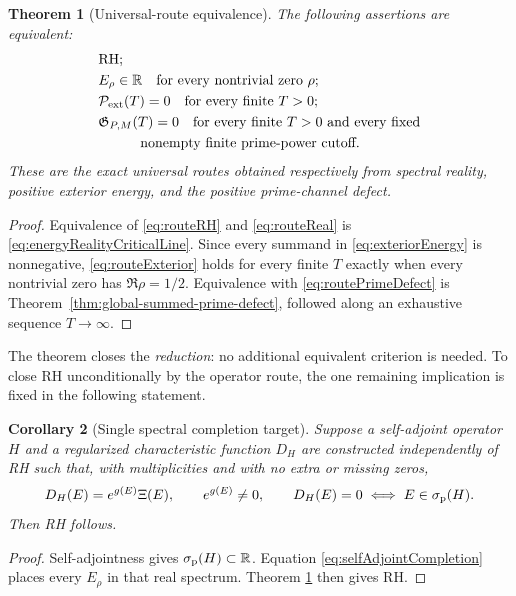 \documentclass[11pt]{amsart}
\newtheorem{theorem}{Theorem}[section]
\newtheorem{corollary}[theorem]{Corollary}
\theoremstyle{definition}
\theoremstyle{remark}
\begin{document}
\begin{theorem}[Universal-route equivalence]\label{thm:universal-route-equivalence}
The following assertions are equivalent:
\begin{align}
 &\text{RH};\label{eq:routeRH}\\
 &E_\rho\in\mathbb R\quad\text{for every nontrivial zero }\rho;\label{eq:routeReal}\\
 &\mathcal P_{\rm ext}(T)=0\quad\text{for every finite }T>0;\label{eq:routeExterior}\\
 &\mathfrak G_{P,M}(T)=0\quad\text{for every finite }T>0
 \text{ and every fixed}\notag\\
 &\hspace{3em}\text{nonempty finite prime-power cutoff}.\label{eq:routePrimeDefect}
\end{align}
These are the exact universal routes obtained respectively from spectral reality, positive
exterior energy, and the positive prime-channel defect.
\end{theorem}

\begin{proof}
Equivalence of \eqref{eq:routeRH} and \eqref{eq:routeReal} is
\eqref{eq:energyRealityCriticalLine}.  Since every summand in
\eqref{eq:exteriorEnergy} is nonnegative, \eqref{eq:routeExterior} holds for every finite
$T$ exactly when every nontrivial zero has $\Re\rho=1/2$.  Equivalence with
\eqref{eq:routePrimeDefect} is Theorem~\ref{thm:global-summed-prime-defect}, followed along
an exhaustive sequence $T\to\infty$.
\end{proof}

The theorem closes the \emph{reduction}: no additional equivalent criterion is needed.  To
close RH unconditionally by the operator route, the one remaining implication is fixed in the
following statement.

\begin{corollary}[Single spectral completion target]\label{cor:spectral-completion-target}
Suppose a self-adjoint operator $H$ and a regularized characteristic function $D_H$ are
constructed independently of RH such that, with multiplicities and with no extra or missing
zeros,
\begin{equation}\label{eq:selfAdjointCompletion}
 D_H(E)=e^{g(E)}\Xi(E),
 \qquad e^{g(E)}\ne0,
 \qquad D_H(E)=0\iff E\in\sigma_{\rm p}(H).
\end{equation}
Then RH follows.
\end{corollary}

\begin{proof}
Self-adjointness gives $\sigma_{\rm p}(H)\subset\mathbb R$.  Equation
\eqref{eq:selfAdjointCompletion} places every $E_\rho$ in that real spectrum.  Theorem
\ref{thm:universal-route-equivalence} then gives RH.
\end{proof}
\end{document}

